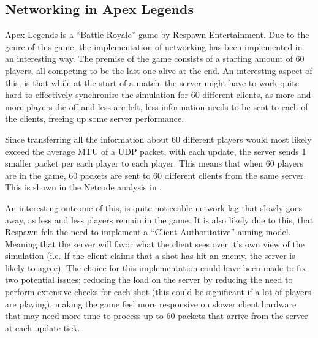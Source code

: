 \subsection{Networking in Apex Legends}
Apex Legends is a ``Battle Royale'' game by Respawn Entertainment. Due to the genre of this game, the implementation of networking has been implemented in an interesting way. The premise of the game consists of a starting amount of 60 players, all competing to be the last one alive at the end. An interesting aspect of this, is that while at the start of a match, the server might have to work quite hard to effectively synchronise the simulation for 60 different clients, as more and more players die off and less are left, less information needs to be sent to each of the clients, freeing up some server performance.

Since transferring all the information about 60 different players would most likely exceed the average MTU of a UDP packet, with each update, the server sends 1 smaller packet per each player to each player. This means that when 60 players are in the game, 60 packets are sent to 60 different clients from the same server. This is shown in the Netcode analysis in .

An interesting outcome of this, is quite noticeable network lag that slowly goes away, as less and less players remain in the game. It is also likely due to this, that Respawn felt the need to implement a ``Client Authoritative'' aiming model. Meaning that the server will favor what the client sees over it's own view of the simulation (i.e. If the client claims that a shot has hit an enemy, the server is likely to agree). The choice for this implementation could have been made to fix two potential issues; reducing the load on the server by reducing the need to perform extensive checks for each shot (this could be significant if a lot of players are playing), making the game feel more responsive on slower client hardware that may need more time to process up to 60 packets that arrive from the server at each update tick.

